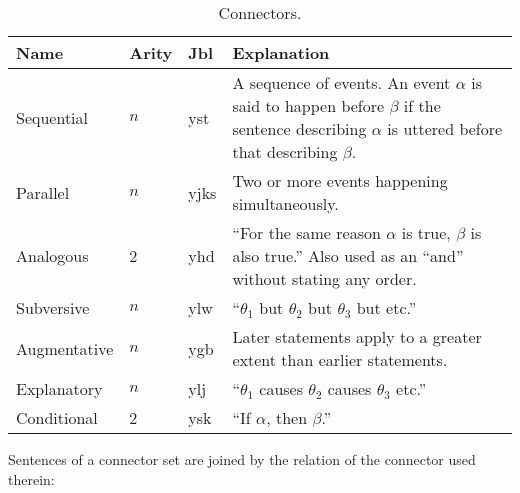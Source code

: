 \documentclass{book}
\newcommand{\lname}{Jbl}
\begin{document}
\begin{table}[ht]
  \caption{Connectors.}
  \centering
  \begin{tabu} to 
    Name & Arity & \textnormal{\lname} & Explanation \\
    \hline
    Sequential & $n$ & yst & A sequence of events. An event $\alpha$ is said to happen before $\beta$ if the sentence describing $\alpha$ is uttered before that describing $\beta$. \\
    Parallel & $n$ & yjks & Two or more events happening simultaneously. \\
    Analogous & 2 & yhd & ``For the same reason $\alpha$ is true, $\beta$ is also true.'' Also used as an ``and'' without stating any order. \\
    Subversive & $n$ & ylw & ``$\theta_1$ but $\theta_2$ but $\theta_3$ but etc.'' \\
    Augmentative & $n$ & ygb & Later statements apply to a greater extent than earlier statements. \\
    Explanatory & $n$ & ylj & ``$\theta_1$ causes $\theta_2$ causes $\theta_3$ etc.'' \\
    Conditional & 2 & ysk & ``If $\alpha$, then $\beta$.'' \\
  \end{tabu}
\end{table}

Sentences of a connector set are joined by the relation of the connector used therein: \\
~\\
 \\
 \\
    \\
   \\
~\\
 \\
 \\
     \\
     \\
~\\
 \\
 \\
    \\
    \\
\end{document}
